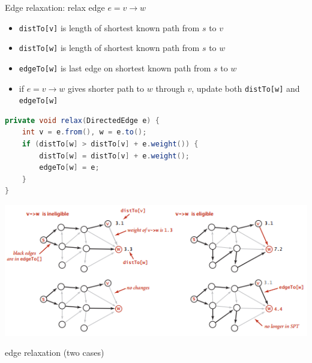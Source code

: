 \documentclass[8pt,a4paper,compress]{beamer}
\begin{document}
\begin{frame}[fragile]
Edge relaxation: relax edge $e = v\to w$
\begin{itemize}
\item \lstinline{distTo[v]} is length of shortest known path from $s$ to $v$

\item \lstinline{distTo[w]} is length of shortest known path from $s$ to $w$

\item \lstinline{edgeTo[w]} is last edge on shortest known path from $s$ to $w$

\item if $e = v\to w$ gives shorter path to $w$ through $v$, update both \lstinline{distTo[w]} and \lstinline{edgeTo[w]}
\end{itemize}

\begin{lstlisting}[language=Java]
private void relax(DirectedEdge e) {
    int v = e.from(), w = e.to();
    if (distTo[w] > distTo[v] + e.weight()) {
        distTo[w] = distTo[v] + e.weight();
        edgeTo[w] = e;
    }
}
\end{lstlisting}

\begin{center}
\includegraphics[scale=0.4]{./figures/sp3.png}

\smallskip

\small edge relaxation (two cases)
\end{center}
\end{frame}
\end{document}
